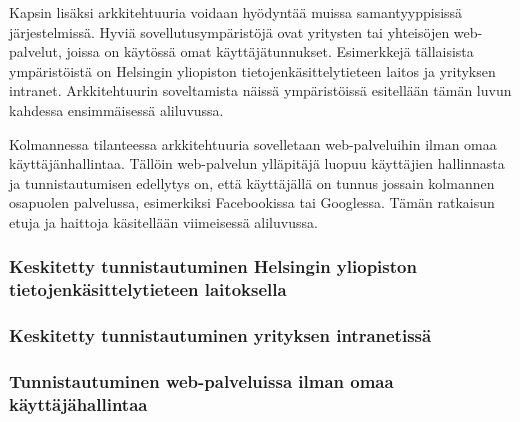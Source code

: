 Kapsin lisäksi arkkitehtuuria voidaan hyödyntää muissa samantyyppisissä järjestelmissä. Hyviä sovellutusympäristöjä ovat yritysten tai yhteisöjen web-palvelut, joissa on käytössä omat käyttäjätunnukset. Esimerkkejä tällaisista ympäristöistä on Helsingin yliopiston tietojenkäsittelytieteen laitos ja yrityksen intranet. Arkkitehtuurin soveltamista näissä ympäristöissä esitellään tämän luvun kahdessa ensimmäisessä aliluvussa.

Kolmannessa tilanteessa arkkitehtuuria sovelletaan web-palveluihin ilman omaa käyttäjänhallintaa. Tällöin web-palvelun ylläpitäjä luopuu käyttäjien hallinnasta ja tunnistautumisen edellytys on, että käyttäjällä on tunnus jossain kolmannen osapuolen palvelussa, esimerkiksi Facebookissa tai Googlessa. Tämän ratkaisun etuja ja haittoja käsitellään viimeisessä aliluvussa.

\subsubsection{Keskitetty tunnistautuminen Helsingin yliopiston tietojenkäsittelytieteen laitoksella}


\subsubsection{Keskitetty tunnistautuminen yrityksen intranetissä}


\subsubsection{Tunnistautuminen web-palveluissa ilman omaa käyttäjähallintaa}
